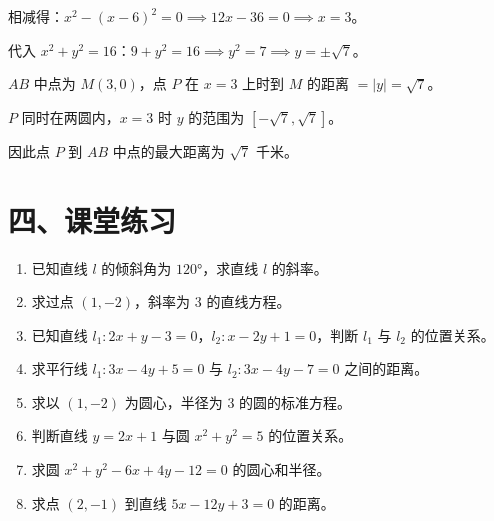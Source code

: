 \documentclass[12pt, a4paper]{ctexart}
\begin{document}
相减得：$x^2 - (x-6)^2 = 0 \implies 12x - 36 = 0 \implies x = 3$。

代入 $x^2 + y^2 = 16$：$9 + y^2 = 16 \implies y^2 = 7 \implies y = \pm\sqrt{7}$。

$AB$ 中点为 $M(3, 0)$，点 $P$ 在 $x = 3$ 上时到 $M$ 的距离 $= |y| = \sqrt{7}$。

$P$ 同时在两圆内，$x = 3$ 时 $y$ 的范围为 $[-\sqrt{7}, \sqrt{7}]$。

因此点 $P$ 到 $AB$ 中点的最大距离为 $\boxed{\sqrt{7}}$ 千米。

\section*{\textcolor{tipgreen}{四、课堂练习}}

\begin{enumerate}
  \item 已知直线 $l$ 的倾斜角为 $120°$，求直线 $l$ 的斜率。
  \item 求过点 $(1, -2)$，斜率为 $3$ 的直线方程。
  \item 已知直线 $l_1: 2x + y - 3 = 0$，$l_2: x - 2y + 1 = 0$，判断 $l_1$ 与 $l_2$ 的位置关系。
  \item 求平行线 $l_1: 3x - 4y + 5 = 0$ 与 $l_2: 3x - 4y - 7 = 0$ 之间的距离。
  \item 求以 $(1, -2)$ 为圆心，半径为 $3$ 的圆的标准方程。
  \item 判断直线 $y = 2x + 1$ 与圆 $x^2 + y^2 = 5$ 的位置关系。
  \item 求圆 $x^2 + y^2 - 6x + 4y - 12 = 0$ 的圆心和半径。
  \item 求点 $(2, -1)$ 到直线 $5x - 12y + 3 = 0$ 的距离。
\end{enumerate}

\bigskip
\end{document}

